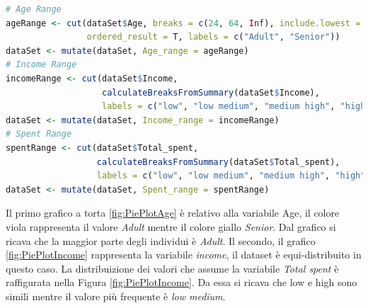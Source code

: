 \documentclass[letterpaper,11pt]{article}
\begin{document}
\begin{lstlisting}[language=R]
# Age Range
ageRange <- cut(dataSet$Age, breaks = c(24, 64, Inf), include.lowest = T,
                ordered_result = T, labels = c("Adult", "Senior"))
dataSet <- mutate(dataSet, Age_range = ageRange)
# Income Range
incomeRange <- cut(dataSet$Income, 
                   calculateBreaksFromSummary(dataSet$Income),
                   labels = c("low", "low medium", "medium high", "high"))
dataSet <- mutate(dataSet, Income_range = incomeRange)
# Spent Range
spentRange <- cut(dataSet$Total_spent, 
                  calculateBreaksFromSummary(dataSet$Total_spent),
                  labels = c("low", "low medium", "medium high", "high"))
dataSet <- mutate(dataSet, Spent_range = spentRange)
\end{lstlisting}

Il primo grafico a torta \ref{fig:PiePlotAge} è relativo alla variabile Age, il colore viola rappresenta il valore \textit{Adult} mentre il colore giallo \textit{Senior}. Dal grafico si ricava che la maggior parte degli individui è \textit{Adult}.
Il secondo, il grafico \ref{fig:PiePlotIncome} rappresenta la variabile \textit{income}, il dataset è equi-distribuito in questo caso.
La distribuizione dei valori che assume la variabile \textit{Total spent} è raffigurata nella Figura \ref{fig:PiePlotIncome}. Da essa si ricava che low e high sono simili mentre il valore più frequente è \textit{low medium}.\\
\end{document}
